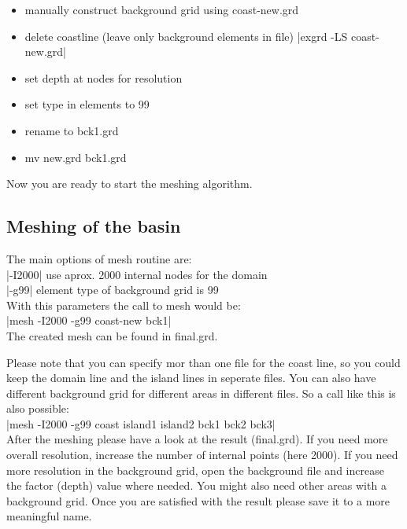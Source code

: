 \begin{itemize}
\item        manually construct background grid using coast-new.grd
\item        delete coastline (leave only background elements in file)
                |exgrd -LS coast-new.grd|
\item        set depth at nodes for resolution
\item        set type in elements to 99 
\item        rename to bck1.grd
\item        mv new.grd bck1.grd
\end{itemize}


Now you are ready to start the meshing algorithm.

\subsection{Meshing of the basin}
The main options of mesh routine are:\\

        |-I2000|          use aprox. 2000 internal nodes for the domain\\
        |-g99|            element type of background grid is 99\\

With this parameters the call to mesh would be:\\

        |mesh -I2000 -g99 coast-new bck1|\\

The created mesh can be found in final.grd.

Please note that you can specify mor than one file for the coast line,
so you could keep the domain line and the island lines in seperate files.
You can also have different background grid for different areas in
different files. So a call like this is also possible:\\

        |mesh -I2000 -g99 coast island1 island2 bck1 bck2 bck3|\\

After the meshing please have a look at the result (final.grd).
If you need more overall resolution, increase the number of internal
points (here 2000). If you need more resolution in the background grid,
open the background file and increase the factor (depth) value where needed.
You might also need other areas with a background grid. Once you
are satisfied with the result please save it to a more meaningful name.\\

